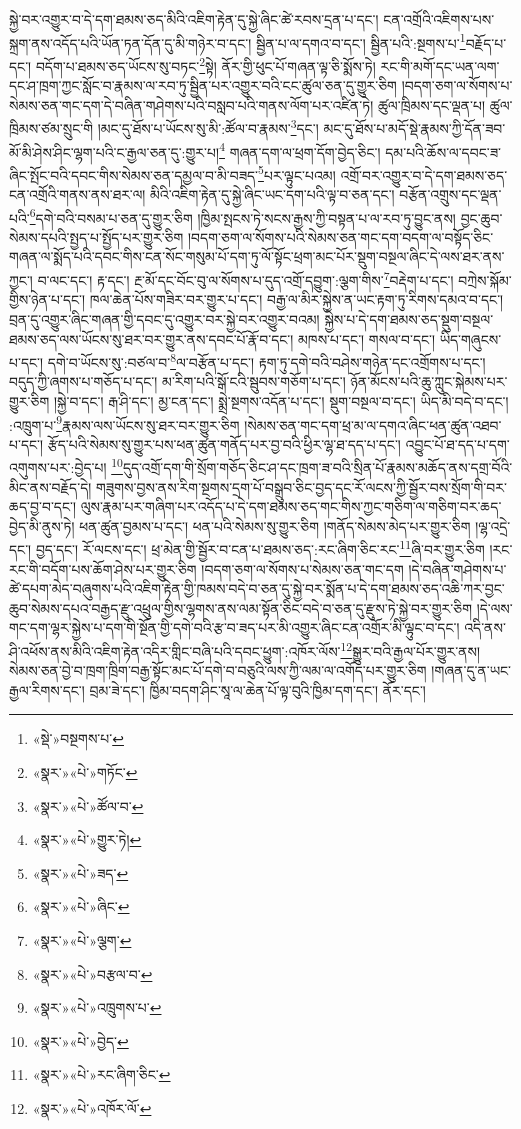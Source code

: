 སྐྱེ་བར་འགྱུར་བ་དེ་དག་ཐམས་ཅད་མིའི་འཇིག་རྟེན་དུ་སྐྱེ་ཞིང་ཚེ་རབས་དྲན་པ་དང་། ངན་འགྲོའི་འཇིགས་པས་སྐྲག་ནས་འདོད་པའི་ཡོན་ཏན་དོན་དུ་མི་གཉེར་བ་དང་། སྦྱིན་པ་ལ་དགའ་བ་དང་། སྦྱིན་པའི་:སྔགས་པ་\footnote{«སྡེ་»བསྔགས་པ་}བརྗོད་པ་དང་། བདོག་པ་ཐམས་ཅད་ཡོངས་སུ་བཏང་\footnote{«སྣར་»«པེ་»གཏོང་}སྟེ། ནོར་གྱི་ཕུང་པོ་གཞན་ལྟ་ཅི་སྨོས་ཏེ། རང་གི་མགོ་དང་ཡན་ལག་དང་ཤ་ཁྲག་ཀྱང་སློང་བ་རྣམས་ལ་རབ་ཏུ་སྦྱིན་པར་འགྱུར་བའི་ངང་ཚུལ་ཅན་དུ་གྱུར་ཅིག །བདག་ཅག་ལ་སོགས་པ་སེམས་ཅན་གང་དག་དེ་བཞིན་གཤེགས་པའི་བསླབ་པའི་གནས་ལོག་པར་འཛིན་ཏེ། ཚུལ་ཁྲིམས་དང་ལྡན་པ། ཚུལ་ཁྲིམས་ཙམ་སྲུང་གི །མང་དུ་ཐོས་པ་ཡོངས་སུ་མི་:ཚོལ་བ་རྣམས་\footnote{«སྣར་»«པེ་»ཚོལ་བ་}དང་། མང་དུ་ཐོས་པ་མདོ་སྡེ་རྣམས་ཀྱི་དོན་ཟབ་མོ་མི་ཤེས་ཤིང་ལྷག་པའི་ང་རྒྱལ་ཅན་དུ་:གྱུར་པ།\footnote{«སྣར་»«པེ་»གྱུར་ཏེ།} གཞན་དག་ལ་ཕྲག་དོག་བྱེད་ཅིང་། དམ་པའི་ཆོས་ལ་དབང་ཟ་ཞིང་སྤོང་བའི་དབང་གིས་སེམས་ཅན་དམྱལ་བ་མི་བཟད་\footnote{«སྣར་»«པེ་»ཟད་}པར་ལྟུང་པའམ། འགྲོ་བར་འགྱུར་བ་དེ་དག་ཐམས་ཅད་ངན་འགྲོའི་གནས་ནས་ཐར་ལ། མིའི་འཇིག་རྟེན་དུ་སྐྱེ་ཞིང་ཡང་དག་པའི་ལྟ་བ་ཅན་དང་། བརྩོན་འགྲུས་དང་ལྡན་པའི་\footnote{«སྣར་»«པེ་»ཞིང་}དགེ་བའི་བསམ་པ་ཅན་དུ་གྱུར་ཅིག །ཁྱིམ་སྤངས་ཏེ་སངས་རྒྱས་ཀྱི་བསྟན་པ་ལ་རབ་ཏུ་བྱུང་ནས། བྱང་ཆུབ་སེམས་དཔའི་སྤྱད་པ་སྤྱོད་པར་གྱུར་ཅིག །བདག་ཅག་ལ་སོགས་པའི་སེམས་ཅན་གང་དག་བདག་ལ་བསྟོད་ཅིང་གཞན་ལ་སྨོད་པའི་དབང་གིས་ངན་སོང་གསུམ་པོ་དག་ཏུ་ལོ་སྟོང་ཕྲག་མང་པོར་སྡུག་བསྔལ་ཞིང་དེ་ལས་ཐར་ནས་ཀྱང་། བ་ལང་དང་། རྟ་དང་། རྔ་མོ་དང་བོང་བུ་ལ་སོགས་པ་དུད་འགྲོ་དབྱུག་:ལྕག་གིས་\footnote{«སྣར་»«པེ་»ལྕག་}བརྡེག་པ་དང་། བཀྲེས་སྐོམ་གྱིས་ཉེན་པ་དང་། ཁལ་ཆེན་པོས་གཟིར་བར་གྱུར་པ་དང་། བརྒྱ་ལ་མིར་སྐྱེས་ན་ཡང་རྟག་ཏུ་རིགས་དམའ་བ་དང་། བྲན་དུ་འགྱུར་ཞིང་གཞན་གྱི་དབང་དུ་འགྱུར་བར་སྐྱེ་བར་འགྱུར་བའམ། སྐྱེས་པ་དེ་དག་ཐམས་ཅད་སྡུག་བསྔལ་ཐམས་ཅད་ལས་ཡོངས་སུ་ཐར་བར་གྱུར་ནས་དབང་པོ་རྣོ་བ་དང་། མཁས་པ་དང་། གསལ་བ་དང་། ཡིད་གཞུངས་པ་དང་། དགེ་བ་ཡོངས་སུ་:བཙལ་བ་\footnote{«སྣར་»«པེ་»བརྩལ་བ་}ལ་བརྩོན་པ་དང་། རྟག་ཏུ་དགེ་བའི་བཤེས་གཉེན་དང་འགྲོགས་པ་དང་། བདུད་ཀྱི་ཞགས་པ་གཅོད་པ་དང་། མ་རིག་པའི་སྒོ་ངའི་སྦུབས་གཅོག་པ་དང་། ཉོན་མོངས་པའི་ཆུ་ཀླུང་སྐེམས་པར་གྱུར་ཅིག །སྐྱེ་བ་དང་། རྒ་ཤི་དང་། མྱ་ངན་དང་། སྨྲེ་སྔགས་འདོན་པ་དང་། སྡུག་བསྔལ་བ་དང་། ཡིད་མི་བདེ་བ་དང་། :འཁྲུག་པ་\footnote{«སྣར་»«པེ་»འཁྲུགས་པ་}རྣམས་ལས་ཡོངས་སུ་ཐར་བར་གྱུར་ཅིག །སེམས་ཅན་གང་དག་ཕྲ་མ་ལ་དགའ་ཞིང་ཕན་ཚུན་འཐབ་པ་དང་། རྩོད་པའི་སེམས་སུ་གྱུར་པས་ཕན་ཚུན་གནོད་པར་བྱ་བའི་ཕྱིར་ལྷ་ཐ་དད་པ་དང་། འབྱུང་པོ་ཐ་དད་པ་དག་འགུགས་པར་:བྱེད་པ། \footnote{«སྣར་»«པེ་»བྱེད་}དུད་འགྲོ་དག་གི་སྲོག་གཅོད་ཅིང་ཤ་དང་ཁྲག་ཟ་བའི་སྲིན་པོ་རྣམས་མཆོད་ནས་དགྲ་བོའི་མིང་ནས་བརྗོད་དེ། གཟུགས་བྱས་ནས་རིག་སྔགས་དྲག་པོ་བསྒྲུབ་ཅིང་བྱད་དང་རོ་ལངས་ཀྱི་སྦྱོར་བས་སྲོག་གི་བར་ཆད་བྱ་བ་དང་། ལུས་རྣམ་པར་གཞིག་པར་འདོད་པ་དེ་དག་ཐམས་ཅད་གང་གིས་ཀྱང་གཅིག་ལ་གཅིག་བར་ཆད་བྱེད་མི་ནུས་ཏེ། ཕན་ཚུན་བྱམས་པ་དང་། ཕན་པའི་སེམས་སུ་གྱུར་ཅིག །གནོད་སེམས་མེད་པར་གྱུར་ཅིག །ལྷ་འདྲེ་དང་། བྱད་དང་། རོ་ལངས་དང་། ཕྲ་མེན་གྱི་སྦྱོར་བ་ངན་པ་ཐམས་ཅད་:རང་ཞིག་ཅིང་རང་\footnote{«སྣར་»«པེ་»རང་ཞིག་ཅིང་}ཞི་བར་གྱུར་ཅིག །རང་རང་གི་བདོག་པས་ཆོག་ཤེས་པར་གྱུར་ཅིག །བདག་ཅག་ལ་སོགས་པ་སེམས་ཅན་གང་དག །དེ་བཞིན་གཤེགས་པ་ཚེ་དཔག་མེད་བཞུགས་པའི་འཇིག་རྟེན་གྱི་ཁམས་བདེ་བ་ཅན་དུ་སྐྱེ་བར་སྨོན་པ་དེ་དག་ཐམས་ཅད་འཆི་ཀར་བྱང་ཆུབ་སེམས་དཔའ་བརྒྱད་རྫུ་འཕྲུལ་གྱིས་ལྷགས་ནས་ལམ་སྟོན་ཅིང་བདེ་བ་ཅན་དུ་རྫུས་ཏེ་སྐྱེ་བར་གྱུར་ཅིག །དེ་ལས་གང་དག་ལྷར་སྐྱེས་པ་དག་གི་སྔོན་གྱི་དགེ་བའི་རྩ་བ་ཟད་པར་མི་འགྱུར་ཞིང་ངན་འགྲོར་མི་ལྟུང་བ་དང་། འདི་ནས་ཤི་འཕོས་ནས་མིའི་འཇིག་རྟེན་འདིར་གླིང་བཞི་པའི་དབང་ཕྱུག་:འཁོར་ལོས་\footnote{«སྣར་»«པེ་»འཁོར་ལོ་}སྒྱུར་བའི་རྒྱལ་པོར་གྱུར་ནས། སེམས་ཅན་བྱེ་བ་ཁྲག་ཁྲིག་བརྒྱ་སྟོང་མང་པོ་དགེ་བ་བཅུའི་ལས་ཀྱི་ལམ་ལ་འགོད་པར་གྱུར་ཅིག །གཞན་དུ་ན་ཡང་རྒྱལ་རིགས་དང་། བྲམ་ཟེ་དང་། ཁྱིམ་བདག་ཤིང་སཱ་ལ་ཆེན་པོ་ལྟ་བུའི་ཁྱིམ་དག་དང་། ནོར་དང་། 